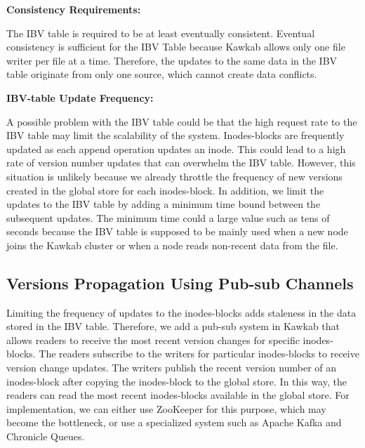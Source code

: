 \documentclass[]{article}
\newcommand{\subtopic}[1]{\vspace{1.5pt} \noindent \textbf{#1}}
\begin{document}
\subtopic{Consistency Requirements:}

The IBV table is required to be at least eventually consistent.  Eventual
consistency is sufficient for the IBV Table because Kawkab allows only one file
writer per file at a time.
Therefore, the updates to the same data in the IBV table originate from only
one source, which cannot create data conflicts.

\subtopic{IBV-table Update Frequency:}

A possible problem with the IBV table could be that the high request rate to
the IBV table may limit the scalability of the system. Inodes-blocks are
frequently updated as each append operation updates an inode. This could lead
to a high rate of version number updates that can overwhelm the IBV table.
However, this situation is unlikely because we already throttle the frequency
of new versions created in the global store for each inodes-block.  In
addition, we limit the updates to the IBV table by adding a minimum time bound
between the subsequent updates. The minimum time
could a large value such as tens of seconds because the IBV table is 
supposed to be mainly used when a new node joins the Kawkab cluster or when a node
reads non-recent data from the file.


\subsection{Versions Propagation Using Pub-sub Channels}

Limiting the frequency of updates to the inodes-blocks adds staleness in the
data stored in the IBV table. Therefore, we add a pub-sub system in Kawkab that
allows readers to receive the most recent version changes for specific
inodes-blocks. The readers subscribe to the writers for particular
inodes-blocks to receive version change updates. The writers publish the recent
version number of an inodes-block after copying the inodes-block to the global
store. In this way, the readers can read the most recent inodes-blocks
available in the global store.
For implementation, we can either use ZooKeeper for this purpose, which may
become the bottleneck, or use a specialized system such as Apache Kafka and
Chronicle Queues.
\end{document}
